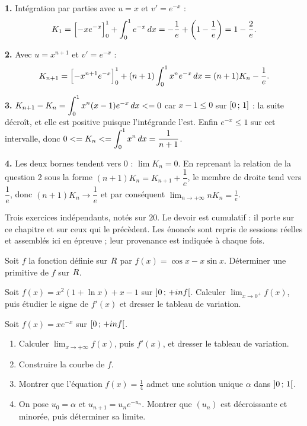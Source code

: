 \begin{corrige}
\textbf{1.} Intégration par parties avec $u = x$ et $v' = e^{-x}$ :
\[
  K_{1} = \Bigl[-xe^{-x}\Bigr]_{0}^{1} + \int_{0}^{1}e^{-x}\,dx
        = -\frac1e + \left(1-\frac1e\right) = 1-\frac{2}{e}.
\]

\textbf{2.} Avec $u = x^{n+1}$ et $v' = e^{-x}$ :
\[
  K_{n+1} = \Bigl[-x^{n+1}e^{-x}\Bigr]_{0}^{1}
          + (n+1)\int_{0}^{1}x^{n}e^{-x}\,dx
          = (n+1)K_{n} - \frac{1}{e}.
\]

\textbf{3.} $K_{n+1}-K_{n} = \displaystyle\int_{0}^{1}x^{n}(x-1)e^{-x}\,dx <= 0$
car $x-1 \leq 0$ sur $\left[0\,;\,1\right]$ : la suite décroît, et elle est
positive puisque l'intégrande l'est. Enfin $e^{-x} \leq 1$ sur cet intervalle,
donc
$0 <= K_{n} <= \displaystyle\int_{0}^{1}x^{n}\,dx = \dfrac{1}{n+1}$.

\textbf{4.} Les deux bornes tendent vers $0$ : $\lim K_{n} = 0$. En reprenant
la relation de la question 2 sous la forme
$(n+1)K_{n} = K_{n+1}+\dfrac1e$, le membre de droite tend vers $\dfrac1e$,
donc $(n+1)K_{n} \to \dfrac1e$ et par conséquent
$\displaystyle\lim_{n\to+\infty} nK_{n} = \frac{1}{e}$.
\end{corrige}


\begin{devoir}[2 heures]
Trois exercices indépendants, notés sur $20$. Le devoir est cumulatif : il porte sur ce chapitre et sur ceux qui le précèdent. Les énoncés sont repris de sessions réelles et assemblés ici en épreuve ; leur provenance est indiquée à chaque fois.

Soit $f$ la fonction définie sur $R$ par $f(x) = \cos x - x\sin x$. Déterminer
une primitive de $f$ sur $R$.

Soit $f(x) = x^{2}(1+\ln x)+x-1$ sur $\left]0\,;\,+inf\right[$. Calculer
$\lim_{x\to0^{+}}f(x)$, puis étudier le signe de $f'(x)$ et dresser le
tableau de variation.

Soit $f(x) = xe^{-x}$ sur $\left[0\,;\,+inf\right[$.
\begin{enumerate}[label=\textbf{\arabic*)}, leftmargin=*, itemsep=0.15em]
  \item Calculer $\lim_{x\to+\infty}f(x)$, puis $f'(x)$, et dresser le tableau
        de variation.
  \item Construire la courbe de $f$.
  \item Montrer que l'équation $f(x) = \frac14$ admet une solution unique
        $\alpha$ dans $\left]0\,;\,1\right[$.
  \item On pose $u_{0} = \alpha$ et $u_{n+1} = u_{n}e^{-u_{n}}$. Montrer que
        $(u_{n})$ est décroissante et minorée, puis déterminer sa limite.
\end{enumerate}

\end{devoir}

